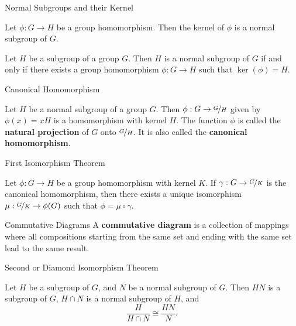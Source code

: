 \documentclass{beamer}
\begin{document}
\begin{frame}{Normal Subgroups and their Kernel}
    \begin{theorem}
        \justifying
        Let $\phi: G \to H$ be a group homomorphism. Then the kernel of $\phi$ is a normal subgroup of $G$.
    \end{theorem}
    \pause
    \begin{theorem}
        \justifying
        Let $H$ be a subgroup of a group $G$. Then $H$ is a normal subgroup of $G$ if and only if there exists a group homomorphism $\phi: G \rightarrow H$ such that $\ker(\phi) = H$.
    \end{theorem}
\end{frame}

\begin{frame}{Canonical Homomorphism}
\begin{theorem}
\justifying
Let $H$ be a normal subgroup of a group $G$. Then $\phi: G \rightarrow \nicefrac{G}{H}$ given by $\phi(x) = xH$ is a homomorphism with kernel $H$. The function $\phi$ is called the \textbf{natural projection} of $G$ onto $\nicefrac{G}{H}$. It is also called the \textbf{canonical homomorphism}.
\end{theorem}    
\end{frame}

\begin{frame}{First Isomorphism Theorem}
\begin{theorem}
\justifying
Let $\phi: G \rightarrow H$ be a group homomorphism with kernel $K$. If $\gamma: G \rightarrow \nicefrac{G}{K}$ is the canonical homomorphism, then there exists a unique isomorphism $\mu:\nicefrac{G}{K} \to \phi(G)$ such that $\phi = \mu \circ \gamma$.
\end{theorem}    
\end{frame}

\begin{frame}{Commutative Diagrams}
\justifying
    A \textbf{commutative diagram} is a collection of mappings where all compositions starting from the same set and ending with the same set lead to the same result.  
\end{frame}

\begin{frame}{Second or Diamond Isomorphism Theorem}
    \begin{theorem}
        \justifying
        Let $H$ be a subgroup of $G$, and $N$ be a normal subgroup of $G$. Then $HN$ is a subgroup of $G$, $H \cap N$ is a normal subgroup of $H$, and
        \[\dfrac{H}{H \cap N} \cong \dfrac{HN}{N}.\]
    \end{theorem}
\end{frame}
\end{document}
